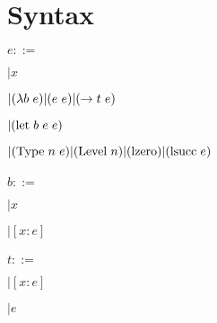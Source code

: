 \documentclass{article}
\begin{document}
\newcommand{\spc}[0]{\hspace{0.3em}}
\newcommand{\lam}[2]{(\lambda #1 \spc #2)}
\newcommand{\app}[2]{(#1 \spc #2)}
\newcommand{\arr}[2]{(\to #1 \spc #2)}
\newcommand{\elet}[3]{(\text{let} \spc #1 \spc #2 \spc #3)}
\newcommand{\Type}[2]{(\text{Type} \spc #1 \spc #2)}
\newcommand{\Level}[1]{(\text{Level} \spc #1)}
\newcommand{\lzero}[0]{(\text{lzero})}
\newcommand{\lsucc}[1]{(\text{lsucc} \spc #1)}

\section{Syntax}

$e ::=$

$| x$

$| \lam{b}{e} | \app{e}{e} | \arr{t}{e}$

$| \elet{b}{e}{e}$

$| \Type{n}{e} | \Level{n} | \lzero | \lsucc{e}$
\\\\
$b ::=$

$| x$

$| [x : e]$
\\\\
$t ::=$

$| [x : e]$

$| e$
\end{document}
